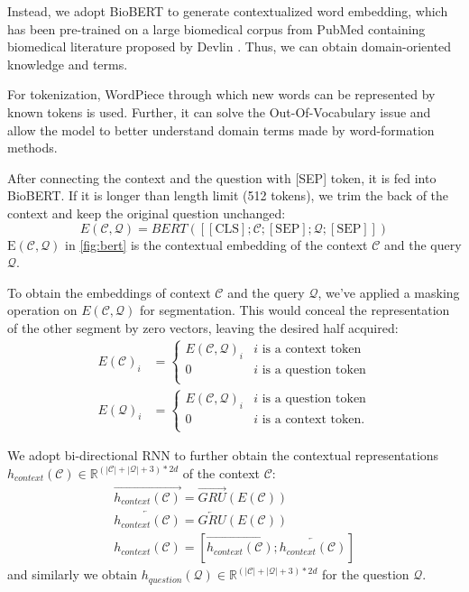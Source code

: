 \documentclass[sigconf, screen]{acmart}
\newcommand{\pubmed}{PubMed\xspace}
\newcommand{\biobert}{Bio\-BERT\xspace}
\begin{document}
Instead, we adopt \biobert to generate contextualized word embedding, which has been pre-trained on a large biomedical corpus from \pubmed containing biomedical literature proposed by Devlin \cite{devlinBERTPretrainingDeep2019}. Thus, we can obtain domain-oriented knowledge and terms.

For tokenization, WordPiece \cite{wuGoogleNeuralMachine2016} through which new words can be represented by known tokens is used. Further, it can solve the Out-Of-Vocabulary issue and allow the model to better understand domain terms made by word-formation methods.

After connecting the context and the question with [SEP] token, it is fed into \biobert. If it is longer than length limit (512 tokens), we trim the back of the context and keep the original question unchanged:
\begin{equation}
    E(\mathcal{C, Q}) = BERT([\mathrm{[CLS]};\mathcal{C}; \mathrm{[SEP]}; \mathcal{Q};\mathrm{[SEP]}])
    \label{fig:bert}
\end{equation}
$\mathrm{E(\mathcal{C, Q})}$ in \cref{fig:bert} is the contextual embedding of the context $\mathcal{C}$ and the query $\mathcal{Q}$. 

To obtain the embeddings of context $\mathcal{C}$ and the query $\mathcal{Q}$, we've applied a masking operation on $E(\mathcal{C, Q})$ for segmentation. This would conceal the representation of the other segment by zero vectors, leaving the desired half acquired:
\begin{align}
    E(\mathcal{C})_i &= \begin{cases}
        E(\mathcal{C, Q})_i & i \text{ is a context token} \\
        0 & i \text{ is a question token} \\
    \end{cases} \\
    E(\mathcal{Q})_i &= \begin{cases}
        E(\mathcal{C, Q})_i & i \text{ is a question token} \\
        0 & i \text{ is a context token.} \\
    \end{cases}
    \label{eq:masking}
\end{align}

We adopt bi-directional RNN to further obtain the contextual representations $h_{context}(\mathcal{C}) \in \mathbb{R}^{(|\mathcal{C}| + |\mathcal{Q}| + 3) * 2d}$ of the context $\mathcal{C}$:
\begin{gather}
    \overrightarrow{h_{context}(\mathcal{C})} = \overrightarrow{GRU}(E(\mathcal{C})) \\
    \overleftarrow{h_{context}(\mathcal{C})} = \overleftarrow{GRU}(E(\mathcal{C})) \\
    h_{context}(\mathcal{C}) = [\overrightarrow{h_{context}(\mathcal{C})}; \overleftarrow{h_{context}(\mathcal{C})}]
\end{gather}
and similarly we obtain $h_{question}(\mathcal{Q}) \in \mathbb{R}^{(|\mathcal{C}| + |\mathcal{Q}| + 3) * 2d}$ for the question $\mathcal{Q}$.
\end{document}
